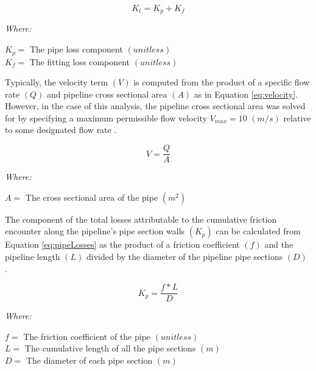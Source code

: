        \begin{equation}
           K_{t} = K_{p} + K_{f}
           \label{eq:totalLosses}
       \end{equation}
       
       \noindent \textit{Where:} \hfill
       
       \begin{center}
           $K_p = $ The pipe loss component $(unitless)$ \\
           $K_f = $ The fitting loss component $(unitless)$ \\
       \end{center}       
       
Typically, the velocity term $(V)$ is computed from the product of a specific flow rate $(Q)$ and pipeline cross sectional area $(A)$ as in Equation \ref{eq:velocity}. However, in the case of this analysis, the pipeline cross sectional area was solved for by specifying a maximum permissible flow velocity $V_{max} = 10$ $(m/s)$ relative to some designated flow rate \cite{Liu2003}.
       
       \begin{equation}
           V = \frac{Q}{A}
           \label{eq:velocity}
       \end{equation}
       
       \noindent \textit{Where:} \hfill
       
       \begin{center}
           $A = $ The cross sectional area of the pipe $(m^2)$\\
       \end{center}      
       
The component of the total losses attributable to the cumulative friction encounter along the pipeline's pipe section walls $(K_p)$ can be calculated from Equation \ref{eq:pipeLosses} as the product of a friction coefficient $(f)$ and the pipeline length $(L)$ divided by the diameter of the pipeline pipe sections $(D)$ \cite{Liu2003}.
       
       \begin{equation}
           K_{p} = \frac{f * L}{D}
           \label{eq:pipeLosses}
       \end{equation}
       
       \noindent \textit{Where:} \hfill
       
       \begin{center}
           $f = $ The friction coefficient of the pipe $(unitless)$ \\
           $L = $ The cumulative length of all the pipe sections $(m)$ \\
           $D = $ The diameter of each pipe section $(m)$ \\
       \end{center}   
       
